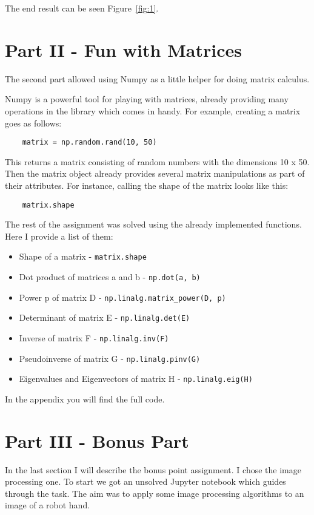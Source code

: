 \documentclass{CPSReport}
\begin{document}
The end result can be seen Figure~\ref{fig:1}.

\section{Part II - Fun with Matrices}
The second part allowed using Numpy as a little helper for doing matrix calculus.

Numpy is a powerful tool for playing with matrices, already providing many operations in the library which comes in handy.
For example, creating a matrix goes as follows:
\begin{verbatim}
    matrix = np.random.rand(10, 50)
\end{verbatim}

This returns a matrix consisting of random numbers with the dimensions 10 x 50.
Then the matrix object already provides several matrix manipulations as part of their attributes.
For instance, calling the shape of the matrix looks like this:
\begin{verbatim}
    matrix.shape
\end{verbatim}

The rest of the assignment was solved using the already implemented functions. Here I provide a list of them:
\begin{itemize}
    \item Shape of a matrix - \texttt{matrix.shape}
    \item Dot product of matrices a and b - \texttt{np.dot(a, b)}
    \item Power p of matrix D - \texttt{np.linalg.matrix_power(D, p)}
    \item Determinant of matrix E - \texttt{np.linalg.det(E)}
    \item Inverse of matrix F - \texttt{np.linalg.inv(F)}
    \item Pseudoinverse of matrix G - \texttt{np.linalg.pinv(G)}
    \item Eigenvalues and Eigenvectors of matrix H - \texttt{np.linalg.eig(H)}  
\end{itemize}

In the appendix you will find the full code.

\section{Part III - Bonus Part}
In the last section I will describe the bonus point assignment. I chose the image processing one. To start we got an unsolved Jupyter notebook which guides through the task. The aim was to apply some image processing algorithms to an image of a robot hand.
\end{document}
